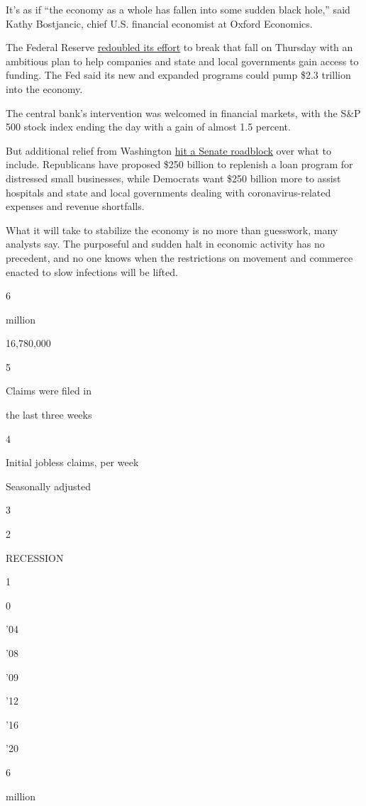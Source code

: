 It's as if ``the economy as a whole has fallen into some sudden black
hole,'' said Kathy Bostjancic, chief U.S. financial economist at Oxford
Economics.

The Federal Reserve
\href{https://www.nytimes.com/2020/03/15/business/economy/federal-reserve-coronavirus.html}{redoubled
its effort} to break that fall on Thursday with an ambitious plan to
help companies and state and local governments gain access to funding.
The Fed said its new and expanded programs could pump \$2.3 trillion
into the economy.

The central bank's intervention was welcomed in financial markets, with
the S\&P 500 stock index ending the day with a gain of almost 1.5
percent.

But additional relief from Washington
\href{https://www.nytimes.com/2020/04/09/us/politics/congress-coronavirus-small-businesses.html}{hit
a Senate roadblock} over what to include. Republicans have proposed
\$250 billion to replenish a loan program for distressed small
businesses, while Democrats want \$250 billion more to assist hospitals
and state and local governments dealing with coronavirus-related
expenses and revenue shortfalls.

What it will take to stabilize the economy is no more than guesswork,
many analysts say. The purposeful and sudden halt in economic activity
has no precedent, and no one knows when the restrictions on movement and
commerce enacted to slow infections will be lifted.

6

million

16,780,000

5

Claims were filed in

the last three weeks

4

Initial jobless claims, per week

Seasonally adjusted

3

2

RECESSION

1

0

'04

'08

'09

'12

'16

'20

6

million

